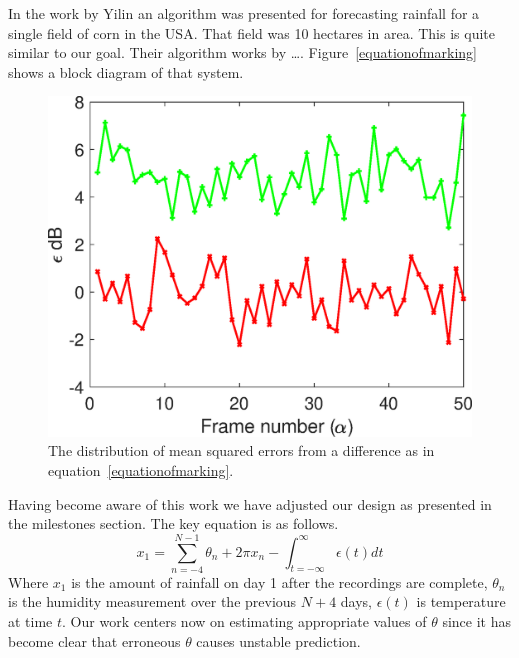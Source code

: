 \documentclass[11pt, a4paper]{article}
\begin{document}
In the work by Yilin an algorithm was presented for forecasting rainfall for a single field of corn in the USA. That field was 10 hectares in area. This is quite similar to our goal. Their algorithm works by \ldots.
Figure~\ref{equationofmarking} shows a block diagram of that system. 
\begin{figure}
  \begin{center}
  \includegraphics[width=0.7\linewidth]{alineplot.eps}
  \end{center}
  \caption{The distribution of mean squared errors from a difference as in equation~\ref{equationofmarking}. \label{bars}}
  \caprule %
  \end{figure}
Having become aware of this work we have adjusted our design as presented in the milestones section.
The key equation is as follows.
\begin{equation}
    x_1 = \sum_{n=-4}^{N-1} \theta_n + 2\pi x_n - \int_{t=-\infty}^{\infty} \epsilon(t) dt \label{equationofmarking}
\end{equation}
Where $x_1$ is the amount of rainfall on day 1 after the recordings are complete, $\theta_n$ is the humidity measurement over the previous $N +4$ days, $\epsilon(t)$ is temperature at time $t$.
Our work centers now on estimating appropriate values of $\theta$ since it has become clear that erroneous $\theta$ causes unstable prediction.
\end{document}
